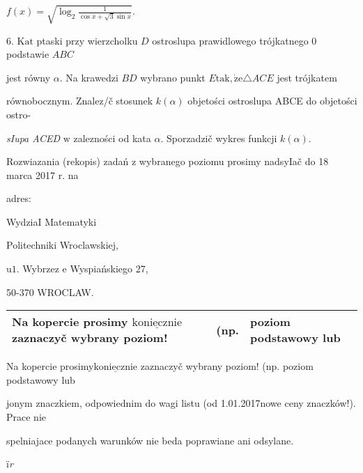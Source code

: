 \documentclass[a4paper,12pt]{article}
\begin{document}
$f(x)=\sqrt{\log_{2}\frac{1}{\cos x+\sqrt{3}\sin x}}.$

6. $\mathrm{K}\mathrm{a}\mathrm{t}$ ptaski przy wierzcholku $D$ ostroslupa prawidlowego trójkatnego $0$ podstawie $ABC$

jest równy $\alpha$. Na krawedzi $BD$ wybrano punkt $E \mathrm{t}\mathrm{a}\mathrm{k}, \dot{\mathrm{z}}\mathrm{e} \triangle ACE$ jest trójkatem

równobocznym. Znalez/č stosunek $k(\alpha)$ objetości ostroslupa ABCE do objetości ostro-

{\it sIupa ACED} $\mathrm{w}$ zalezności od kata $\alpha$. Sporzadzič wykres funkcji $k(\alpha).$

Rozwiazania (rekopis) zadań $\mathrm{z}$ wybranego poziomu prosimy nadsyIač do 18 marca 2017 $\mathrm{r}$. na

adres:

WydziaI Matematyki

Politechniki Wroclawskiej,

$\mathrm{u}1$. Wybrzez $\mathrm{e}$ Wyspiańskiego 27,

50-370 WROCLAW.
\begin{center}
\begin{tabular}{|l|l|l|}
\hline
\multicolumn{1}{|l|}{Na kopercie prosimy $\underline{\mathrm{k}\mathrm{o}\mathrm{n}\mathrm{i}\mathrm{e}\mathrm{c}\mathrm{z}\mathrm{n}\mathrm{i}\mathrm{e}}$ zaznaczyč wybrany poziom!}&	\multicolumn{1}{|l|}{(np.}&	\multicolumn{1}{|l|}{poziom podstawowy lub}	\\
\hline
\end{tabular}

\end{center}
Na kopercie prosimy$\underline{\mathrm{k}\mathrm{o}\mathrm{n}\mathrm{i}\mathrm{e}\mathrm{c}\mathrm{z}\mathrm{n}\mathrm{i}\mathrm{e}}$ zaznaczyč wybrany poziom! (np. poziom podstawowy lub

jonym znaczkiem, odpowiednim do wagi listu (od 1.01.2017nowe ceny znaczków!). Prace nie

spelniajace podanych warunków nie beda poprawiane ani odsylane.

ï{\it r}
\end{document}
